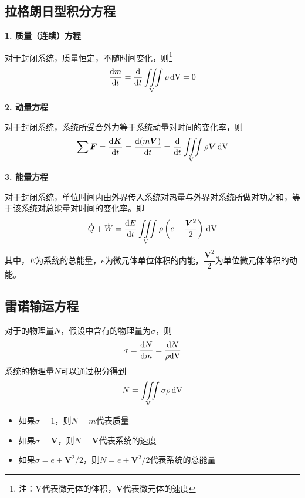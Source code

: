 \subsection{拉格朗日型积分方程}

\noindent \textbf{1. 质量（连续）方程}

对于封闭系统，质量恒定，不随时间变化，则\footnote[1]{注：$\text{V}$代表微元体的体积，$\bm{V}$代表微元体的速度}
\begin{equation}
	\dfrac{{\rm{d}} m}{{\rm{d}} t} =\dfrac{{\rm{d}} }{{\rm{d}} t} \iiint \limits_{\text{V}} \rho \,{\rm{d}} \text{V} = 0
\end{equation}
\vspace*{1em}

\noindent \textbf{2. 动量方程}

对于封闭系统，系统所受合外力等于系统动量对时间的变化率，则
\begin{equation}
	\sum \bm{F} = \dfrac{{\rm{d}} \bm{K}}{{\rm{d}} t} = \dfrac{{\rm{d}} (m \bm{V})}{{\rm{d}} t} = \dfrac{{\rm{d}} }{{\rm{d}} t} \iiint\limits_{\text{V}} \rho \bm{V} \, {\rm{d}} \text{V}
\end{equation}
\vspace*{1em}

\noindent \textbf{3. 能量方程}

对于封闭系统，单位时间内由外界传入系统对热量与外界对系统所做对功之和，等于该系统对总能量对时间的变化率。即
\begin{equation}
	\dot{Q} + \dot{W} = \dfrac{{\rm{d}} E}{{\rm{d}} t} \iiint\limits_{\text{V}} \rho \left(e + \dfrac{\bm{V}^2}{2}\right)\, {\rm{d}} \text{V}
\end{equation}
其中，$E$为系统的总能量，$e$为微元体单位体积的内能，$\dfrac{\bm{V}^2}{2}$为单位微元体体积的动能。
\vspace*{1em}

\subsection{雷诺输运方程}
对于\blue[系统]的物理量$N$，假设\red[单位质量流体]中含有的物理量为$\sigma$，则
\begin{equation}
	\sigma = \dfrac{{\rm{d}} N}{{\rm{d}} m} = \dfrac{{\rm{d}} N}{\rho {\rm{d}} \text{V}}
\end{equation}
系统的物理量$N$可以通过积分得到
\begin{equation}
	N = \iiint\limits_{\text{V}} \sigma \rho \, {\rm{d}} \text{V}
\end{equation}
\begin{itemize}
	\item 如果$\sigma = 1$，则$N = m$代表质量\vspace*{-0.5em}
	\item 如果$\sigma = \bm{V}$，则$N = \bm{V}$代表系统的速度\vspace*{-0.5em}
	\item 如果$\sigma = e + \bm{V}^2/2$，则$N = e + \bm{V}^2/2$代表系统的总能量
\end{itemize}

